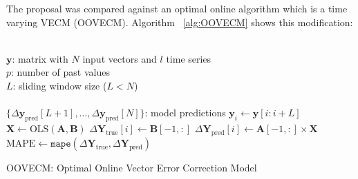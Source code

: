 The proposal was compared against an optimal online algorithm which is a time varying
VECM (OOVECM). Algorithm ~\ref{alg:OOVECM} shows this modification:


\begin{algorithm}[ht]
\begin{algorithmic}[1]
\REQUIRE $\,$ \\
$\mathbf{y}$: matrix with $N$ input vectors and $l$ time series\\
$p$: number of past values \\
$L$: sliding window size ($L<N$) \\
\ENSURE  $\,$ \\
$\{\Delta \mathbf{y}_{\text{pred}}[L+1],\dots,\Delta \mathbf{y}_{\text{pred}}[N]\}$: model predictions 
    \STATE $\mathbf{y}_i \gets \mathbf{y}[i:i+L]$
    \STATE $\mathbf{X} \gets \text{OLS} (\mathbf{A},\mathbf{B})$%
    \STATE $\Delta \mathbf{Y}_{\text{true}}[i] \gets \mathbf{B}[-1,:]$
    \STATE $\Delta \mathbf{Y}_{\text{pred}}[i] \gets \mathbf{A}[-1,:] \times \mathbf{X}$
\ENDFOR
    \STATE $\text{MAPE} \gets \texttt{mape}(\Delta \mathbf{Y}_{\text{true}}, \Delta
    \mathbf{Y}_{\text{pred}})$
\end{algorithmic}
\caption{OOVECM: Optimal Online Vector Error Correction Model}
\label{alg:OOVECM}
\end{algorithm}



